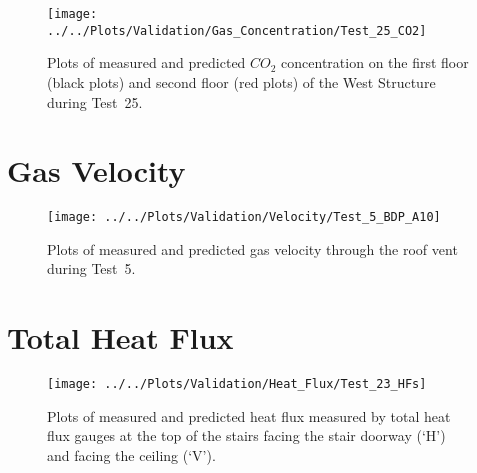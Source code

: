 \begin{figure}[!h]
	\centering
	\texttt{[image: ../../Plots/Validation/Gas\_Concentration/Test\_25\_CO2]}
	\caption[Plots of measured and predicted $CO_2$ concentration during Test~25.]{Plots of measured and predicted $CO_2$ concentration on the first floor (black plots) and second floor (red plots) of the West Structure during Test~25.}
	\label{fig:Test25_CO2}
\end{figure}

\clearpage
\section{Gas Velocity}
\begin{figure}[!h]
	\centering
	\texttt{[image: ../../Plots/Validation/Velocity/Test\_5\_BDP\_A10]}
	\caption[Plots of measured and predicted gas velocity through the roof vent during Test~5.]{Plots of measured and predicted gas velocity through the roof vent during Test~5.}
	\label{fig:Test5_BDPs}
\end{figure}

\clearpage
\section{Total Heat Flux}
\begin{figure}[!h]
	\centering
	\texttt{[image: ../../Plots/Validation/Heat\_Flux/Test\_23\_HFs]}
	\caption[Plots of measured and predicted heat flux during Test~23.]{Plots of measured and predicted heat flux measured by total heat flux gauges at the top of the stairs facing the stair doorway (`H') and facing the ceiling (`V').}
	\label{fig:Test5_BDPs}
\end{figure}
